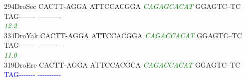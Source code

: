 \documentclass[11pt,twoside,reqno,a4paper]{article}
\begin{document}
{294\hspace*{1\charwidth}DroSec	CACTT-AGGA	ATTCCACGGA	\textit{\textcolor{Green}{C}}\textit{\textcolor{Green}{A}}\textit{\textcolor{Green}{G}}\textit{\textcolor{Green}{A}}\textit{\textcolor{Green}{G}}\textit{\textcolor{Green}{C}}\textit{\textcolor{Green}{A}}\textit{\textcolor{Green}{C}}\textit{\textcolor{Green}{A}}\textit{\textcolor{Green}{T}}	GGAGTC--TC	TAG-------	----------	\\
\hspace*{4\charwidth}\hspace*{7\charwidth}\hspace*{1\charwidth}\hspace*{1\charwidth}\hspace*{20\charwidth}\textit{\textcolor{Green}{12.2}}\hspace*{1\charwidth}\hspace*{1\charwidth}\hspace*{1\charwidth}\hspace*{1\charwidth}\\
334\hspace*{1\charwidth}DroYak	CACTT-AGGA	ATTCCACGGA	\textit{\textcolor{Green}{C}}\textit{\textcolor{Green}{A}}\textit{\textcolor{Green}{G}}\textit{\textcolor{Green}{A}}\textit{\textcolor{Green}{C}}\textit{\textcolor{Green}{C}}\textit{\textcolor{Green}{A}}\textit{\textcolor{Green}{C}}\textit{\textcolor{Green}{A}}\textit{\textcolor{Green}{T}}	GGAGTC--TC	TAG-------	----------	\\
\hspace*{4\charwidth}\hspace*{7\charwidth}\hspace*{1\charwidth}\hspace*{1\charwidth}\hspace*{20\charwidth}\textit{\textcolor{Green}{11.0}}\hspace*{1\charwidth}\hspace*{1\charwidth}\hspace*{1\charwidth}\hspace*{1\charwidth}\\
319\hspace*{1\charwidth}DroEre	CACTT-AGGA	ATTCCACGCA	\textit{\textcolor{Green}{C}}\textit{\textcolor{Green}{A}}\textit{\textcolor{Green}{G}}\textit{\textcolor{Green}{A}}\textit{\textcolor{Green}{C}}\textit{\textcolor{Green}{C}}\textit{\textcolor{Green}{A}}\textit{\textcolor{Green}{C}}\textit{\textcolor{Green}{A}}\textit{\textcolor{Green}{T}}	GGAGTC--TC	\textcolor{Blue}{T}\textcolor{Blue}{A}\textcolor{Blue}{G}\textcolor{Blue}{-}\textcolor{Blue}{-}\textcolor{Blue}{-}\textcolor{Blue}{-}\textcolor{Blue}{-}\textcolor{Blue}{-}\textcolor{Blue}{-}	\textcolor{Blue}{-}\textcolor{Blue}{-}\textcolor{Blue}{-}\textcolor{Blue}{-}\textcolor{Blue}{-}\textcolor{Blue}{-}\textcolor{Blue}{-}\textcolor{Blue}{-}\textcolor{Blue}{-}\textcolor{Blue}{-}	\\
}
\end{document}

